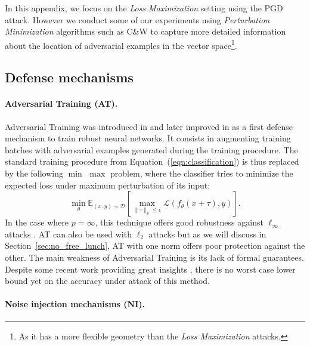 In this appendix, we focus on the {\em Loss Maximization} setting using the PGD attack. However we  conduct some of our experiments using {\em Perturbation Minimization} algorithms such as C\&W to capture more detailed information about the location of adversarial examples in the vector space\footnote{As it has a more flexible geometry than the {\em Loss Maximization} attacks.}. 

\subsection{Defense mechanisms}
\label{subsec:defense_mechanisms}

\paragraph{Adversarial Training (AT).}
\label{paragraph:adversarial_training}

Adversarial Training was introduced in \cite{goodfellow2014explaining} and later improved in \cite{madry2018towards} as a first defense mechanism to train robust neural networks. It consists in augmenting training batches with adversarial examples generated during the training procedure. The standard training procedure from Equation~(\ref{eqn:classification}) is thus replaced by the following  $\min$ $\max$ problem, where the classifier tries to minimize the expected loss under maximum perturbation of its input:
\begin{equation}
    \min_{\theta}\mathbb{E}_{(x, y)\sim \mathcal{D}} \left[ \max_{\lVert\tau\rVert_p \leq \epsilon} \mathcal{L} \left( f_{\theta}(x+\tau), y \right) \right].
\end{equation}
\noindent
In the case where $p=\infty$, this technique offers good robustness  against $\ell_\infty$ attacks \cite{athalye2018obfuscated}. AT can also be used with $\ell_2$ attacks but as we will discuss in Section~\ref{sec:no_free_lunch}, AT with one norm offers poor protection against the other.
The main weakness of Adversarial Training is its lack of formal guarantees. Despite some recent work providing great insights \cite{sinha2017certifying,zhang2019theoretically}, there is no worst case lower bound yet on the accuracy under attack of this method.


\paragraph{Noise injection mechanisms (NI).}\label{subsec:randomized_training}



